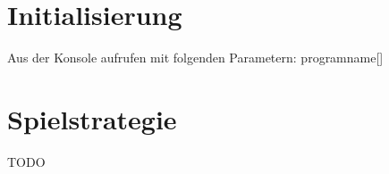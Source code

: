 \documentclass[a4paper]{article}
\title{}
\author{Allers, Sven \& Gläser, Christian}
\begin{document}
\maketitle

\begin{abstract}

\end{abstract}

\section{Initialisierung}
Aus der Konsole aufrufen mit folgenden Parametern:
programname[]

\section{Spielstrategie}
TODO
\end{document}
